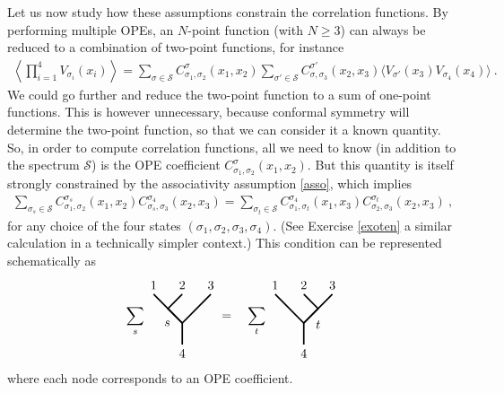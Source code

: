\documentclass[12pt, a4paper, notitlepage, twoside]{report}
\numberwithin{equation}{section}
\theoremstyle{break}
\begin{document}
Let us now study how these assumptions constrain the correlation functions.
By performing multiple OPEs, an $N$-point function (with $N\geq 3$) can always be reduced to a combination of two-point functions, for instance
\begin{align}
 \left\langle \prod_{i=1}^4 V_{\sigma_i}(x_i) \right\rangle = \sum_{\sigma\in \mathcal{S}} C_{\sigma_1,\sigma_2}^{\sigma}(x_1,x_2)\sum_{\sigma'\in \mathcal{S}} C_{\sigma,\sigma_3}^{\sigma'}(x_2,x_3)\Big\langle V_{\sigma'}(x_3)V_{\sigma_4}(x_4)\Big\rangle\ .
\end{align}
We could go further and reduce the two-point function to a sum of one-point functions.
This is however unnecessary, because conformal symmetry will determine the two-point function, so that we can consider it a known quantity.
So, in order to compute correlation functions, all we need to know (in addition to the spectrum $\mathcal{S}$) is the OPE coefficient $C_{\sigma_1,\sigma_2}^{\sigma}(x_1,x_2)$.
But this quantity is itself strongly constrained by the associativity assumption \eqref{asso}, which implies
\begin{align}
 \sum_{\sigma_s\in \mathcal{S}} C_{\sigma_1,\sigma_2}^{\sigma_s}(x_1,x_2) C_{\sigma_s,\sigma_3}^{\sigma_4}(x_2,x_3) = \sum_{\sigma_t\in \mathcal{S}} C_{\sigma_1,\sigma_t}^{\sigma_4}(x_1,x_3)C_{\sigma_2,\sigma_3}^{\sigma_t}(x_2,x_3)\ ,
\label{cccc}
\end{align}
for any choice of the four states $(\sigma_1,\sigma_2,\sigma_3,\sigma_4)$.
(See Exercise \ref{exoten} a similar calculation in a technically simpler context.) This condition can be represented schematically as 
\begin{align}
\sum_{s} 
 \begin{tikzpicture}[scale = .2, baseline=(current  bounding  box.center), very thick]
  \draw (-4,3) node [above] {$1$} -- (0, -1) -- (4, 3) node [above] {$3$};
  \draw (0, 3) node [above] {$2$} -- (-2, 1) -- node [below left] {$s$} (0, -1) -- (0, -4) node [below] {$4$};
 \end{tikzpicture}
= \quad
\sum_{t} 
\begin{tikzpicture}[scale = .2, baseline=(current  bounding  box.center), very thick]
  \draw (-4,3) node [above] {$1$} -- (0, -1) -- (4, 3) node [above] {$3$};
  \draw (0, 3) node [above] {$2$} -- (2, 1) -- node [below right] {$t$} (0, -1) -- (0, -4) node [below] {$4$};
  \end{tikzpicture}
\label{sdsd}
\end{align}
where each node corresponds to an OPE coefficient. 
\end{document}
